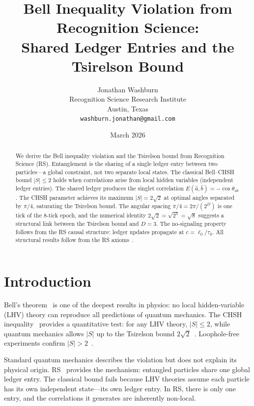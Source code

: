 \documentclass[12pt,a4paper]{article}
\title{Bell Inequality Violation from Recognition Science:\\
Shared Ledger Entries and the Tsirelson Bound}
\author{Jonathan Washburn\\
Recognition Science Research Institute\\
Austin, Texas\\
\texttt{washburn.jonathan@gmail.com}}
\date{March 2026}
\theoremstyle{definition}
\theoremstyle{remark}
\begin{document}
\maketitle

\begin{abstract}
We derive the Bell inequality violation and the Tsirelson bound
from Recognition Science (RS).  Entanglement is the sharing of a
single ledger entry between two particles---a global constraint,
not two separate local states.  The classical Bell--CHSH bound
$|S| \leq 2$ holds when correlations arise from local hidden
variables (independent ledger entries).  The shared ledger
produces the singlet correlation
$E(\hat{a}, \hat{b}) = -\cos\theta_{ab}$.  The CHSH parameter
achieves its maximum $|S| = 2\sqrt{2}$ at optimal angles
separated by $\pi/4$, saturating the Tsirelson bound.  The
angular spacing $\pi/4 = 2\pi/(2^D)$ is one tick of the 8-tick
epoch, and the numerical identity
$2\sqrt{2} = \sqrt{2^3} = \sqrt{8}$ suggests a structural link
between the Tsirelson bound and $D = 3$.  The no-signaling property
follows from the RS causal structure: ledger updates propagate
at $c = \ell_0/\tau_0$.  All structural results follow from the RS axioms~\cite{RS_Axioms}.
\end{abstract}

\section{Introduction}
\label{sec:intro}

Bell's theorem~\cite{Bell1964} is one of the deepest results in
physics: no local hidden-variable (LHV) theory can reproduce all
predictions of quantum mechanics.  The CHSH
inequality~\cite{CHSH1969} provides a quantitative test: for any
LHV theory, $|S| \leq 2$, while quantum mechanics allows
$|S|$ up to the Tsirelson bound
$2\sqrt{2}$~\cite{Tsirelson1980}.  Loophole-free experiments
confirm $|S| > 2$~\cite{Hensen2015, Giustina2015, Shalm2015}.

Standard quantum mechanics describes the violation but does not
explain its physical origin.  RS~\cite{RS_Axioms} provides the mechanism:
entangled particles share one global ledger entry.  The
classical bound fails because LHV theories assume each particle
has its own independent state---its own ledger entry.  In RS,
there is only one entry, and the correlations it generates are
inherently non-local.
\end{document}
